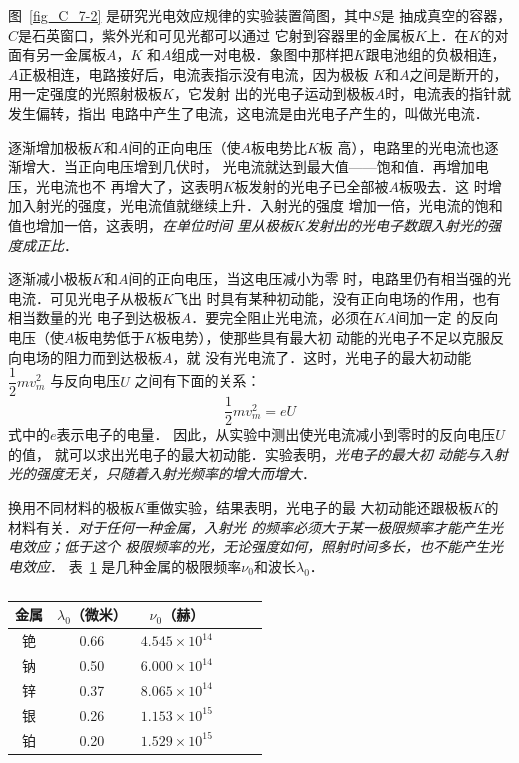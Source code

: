图~\ref{fig_C_7-2} 是研究光电效应规律的实验装置简图，其中$S$是
抽成真空的容器，$C$是石英窗口，紫外光和可见光都可以通过
它射到容器里的金属板$K$上．在$K$的对面有另一金属板$A$，$K$
和$A$组成一对电极．象图中那样把$K$跟电池组的负极相连，
$A$正极相连，电路接好后，电流表指示没有电流，因为极板
$K$和$A$之间是断开的，用一定强度的光照射极板$K$，它发射
出的光电子运动到极板$A$时，电流表的指针就发生偏转，指出
电路中产生了电流，这电流是由光电子产生的，叫做光电流．

逐渐增加极板$K$和$A$间的正向电压（使$A$板电势比$K$板
高），电路里的光电流也逐渐增大．当正向电压增到几伏时，
光电流就达到最大值——饱和值．再增加电压，光电流也不
再增大了，这表明$K$板发射的光电子已全部被$A$板吸去．这
时增加入射光的强度，光电流值就继续上升．入射光的强度
增加一倍，光电流的饱和值也增加一倍，这表明，\textit{在单位时间
里从极板$K$发射出的光电子数跟入射光的强度成正比}．

逐渐减小极板$K$和$A$间的正向电压，当这电压减小为零
时，电路里仍有相当强的光电流．可见光电子从极板$K$飞出
时具有某种初动能，没有正向电场的作用，也有相当数量的光
电子到达极板$A$．要完全阻止光电流，必须在$KA$间加一定
的反向电压（使$A$板电势低于$K$板电势），使那些具有最大初
动能的光电子不足以克服反向电场的阻力而到达极板$A$，就
没有光电流了．这时，光电子的最大初动能
$\dfrac{1}{2}mv^2_m$
与反向电压$U$
之间有下面的关系：
\[\dfrac{1}{2}mv^2_m=eU \]
式中的$e$表示电子的电量．
因此，从实验中测出使光电流减小到零时的反向电压$U$的值，
就可以求出光电子的最大初动能．实验表明，\textit{光电子的最大初
动能与入射光的强度无关，只随着入射光频率的增大而增大}．

换用不同材料的极板$K$重做实验，结果表明，光电子的最
大初动能还跟极板$K$的材料有关．\textit{对于任何一种金属，入射光
的频率必须大于某一极限频率才能产生光电效应；低于这个
极限频率的光，无论强度如何，照射时间多长，也不能产生光
电效应}．
表~\ref{tab_C_7-1} 是几种金属的极限频率$\nu_0$和波长$\lambda_0$．

\begin{table}[htbp]
	\centering
	\caption{}\label{tab_C_7-1}
    \begin{tabular}{cccccc}
        \toprule
        金属& $\lambda_0$（微米）& $\nu_0$（赫）\\
        \midrule
        铯&0.66&$4.545\times 10^{14}$ \\
        钠&0.50&$6.000\times 10^{14}$\\
        锌&0.37&$8.065\times 10^{14}$\\
        银&0.26&$1.153\times 10^{15}$\\
        铂& 0.20&$1.529\times 10^{15}$\\
        \bottomrule
    \end{tabular}
\end{table}



